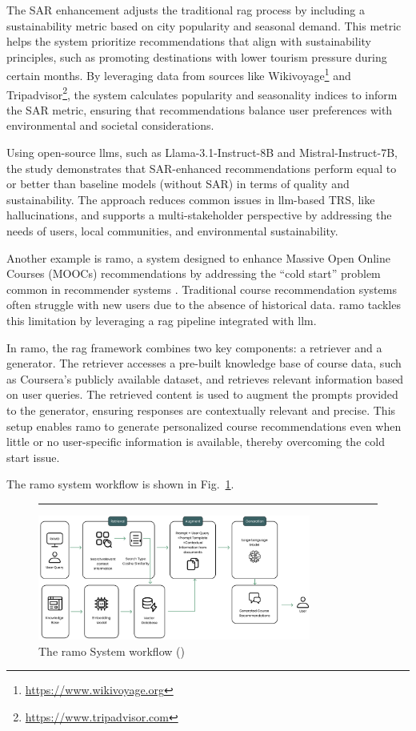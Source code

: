 The SAR enhancement adjusts the traditional \gls{rag} process by including a sustainability metric based on city popularity and seasonal demand.
This metric helps the system prioritize recommendations that align with sustainability principles, such as promoting destinations with lower tourism pressure during certain months.
By leveraging data from sources like Wikivoyage\footnote{\url{https://www.wikivoyage.org}} and Tripadvisor\footnote{\url{https://www.tripadvisor.com}}, the system calculates popularity and seasonality indices to inform the SAR metric, ensuring that recommendations balance user preferences with environmental and societal considerations.

Using open-source \glspl{llm}, such as Llama-3.1-Instruct-8B and Mistral-Instruct-7B, the study demonstrates that SAR-enhanced recommendations perform equal to or better than baseline models (without SAR) in terms of quality and sustainability.
The approach reduces common issues in \gls{llm}-based TRS, like hallucinations, and supports a multi-stakeholder perspective by addressing the needs of users, local communities, and environmental sustainability.

Another example is \gls{ramo}, a system designed to enhance Massive Open Online Courses (MOOCs) recommendations by addressing the ``cold start'' problem common in recommender systems \cite{Rao2024}.
Traditional course recommendation systems often struggle with new users due to the absence of historical data.
\gls{ramo} tackles this limitation by leveraging a \gls{rag} pipeline integrated with \gls{llm}.

In \gls{ramo}, the \gls{rag} framework combines two key components: a retriever and a generator.
The retriever accesses a pre-built knowledge base of course data, such as Coursera's publicly available dataset, and retrieves relevant information based on user queries.
The retrieved content is used to augment the prompts provided to the generator, ensuring responses are contextually relevant and precise.
This setup enables \gls{ramo} to generate personalized course recommendations even when little or no user-specific information is available, thereby overcoming the cold start issue.

The \gls{ramo} system workflow is shown in Fig.~\ref{fig:ramo-system-workflow}.

\begin{figure}[htbp]
    \centering
    \rule{35em}{0.5pt}
    \includegraphics[width=0.8\textwidth]{03_Figures/literature-review/ramo.png}
    \caption{The \gls{ramo} System workflow (\textcite{Rao2024})}
 \label{fig:ramo-system-workflow}
\end{figure}

